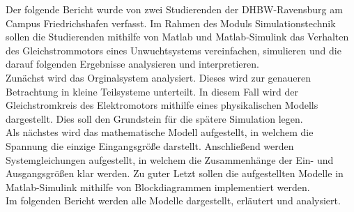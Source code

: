 \label{kurzfassung}

Der folgende Bericht wurde von zwei Studierenden der \ac{DHBW}-Ravensburg am Campus Friedrichshafen verfasst. Im Rahmen des Moduls Simulationstechnik sollen die Studierenden mithilfe von Matlab und Matlab-Simulink das Verhalten des Gleichstrommotors eines Unwuchtsystems vereinfachen, simulieren und die darauf folgenden Ergebnisse analysieren und interpretieren. \\
Zunächst wird das Orginalsystem analysiert. Dieses wird zur genaueren Betrachtung in kleine Teilsysteme unterteilt. In diesem Fall wird der Gleichstromkreis des Elektromotors mithilfe eines physikalischen Modells dargestellt. Dies soll den Grundstein für die spätere Simulation legen. \\
Als nächstes wird das mathematische Modell aufgestellt, in welchem die Spannung die einzige Eingangsgröße darstellt. Anschließend werden Systemgleichungen aufgestellt, in welchem die Zusammenhänge der Ein- und Ausgangsgrößen klar werden. Zu guter Letzt sollen die aufgestellten Modelle in Matlab-Simulink mithilfe von Blockdiagrammen implementiert werden. \\
Im folgenden Bericht werden alle Modelle dargestellt, erläutert und analysiert.